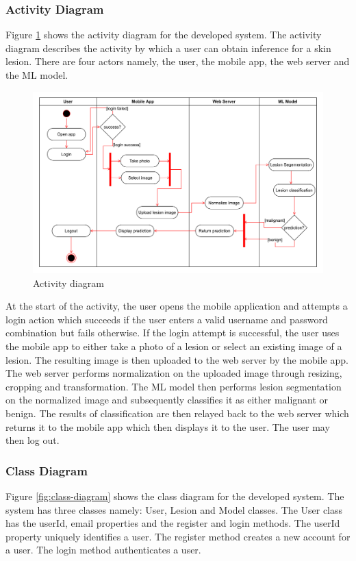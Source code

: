 \documentclass[12pt, a4paper]{article}
\begin{document}
\subsubsection{Activity Diagram}
Figure \ref{fig:activity-diagram} shows the activity diagram for the developed system. The activity diagram describes the activity by which a user can obtain inference for a skin lesion. There are four actors namely, the user, the mobile app, the web server and the ML model.
\begin{figure}[h]
    \centering
    \setlength{\fboxsep}{8pt}
    \includegraphics[scale=0.096, fbox]{activity-diagram.png}
    \caption{Activity diagram}
    \label{fig:activity-diagram}
\end{figure}

At the start of the activity, the user opens the mobile application and attempts a login action which succeeds if the user enters a valid username and password combination but fails otherwise. If the login attempt is successful, the user uses the mobile app to either take a photo of a lesion or select an existing image of a lesion. The resulting image is then uploaded to the web server by the mobile app. The web server performs normalization on the uploaded image through resizing, cropping and transformation. The ML model then performs lesion segmentation on the normalized image and subsequently classifies it as either malignant or benign. The results of classification are then relayed back to the web server which returns it to the mobile app which then displays it to the user. The user may then log out.
\subsubsection{Class Diagram}
Figure \ref{fig:class-diagram} shows the class diagram for the developed system. The system has three classes namely: User, Lesion and Model classes. The User class has the userId, email properties and the register and login methods. The userId property uniquely identifies a user. The register method creates a new account for a user. The login method authenticates a user. 
\end{document}
